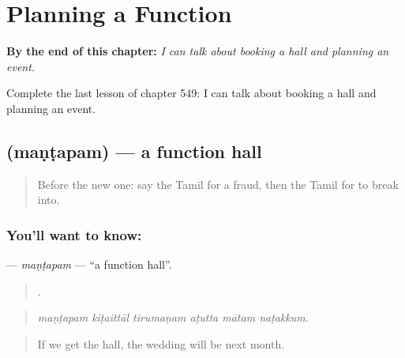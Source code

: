 
\chapter{Planning a Function}
\label{ch:ta-planning-a-function}

\begin{chapteropening}
\textbf{By the end of this chapter:} \emph{I can talk about booking a hall and planning an event.}

Complete the last lesson of chapter 549: I can talk about booking a hall and planning an event.
\end{chapteropening}

\section[\texorpdfstring{\ta{மண்டபம்} (maṇṭapam)}{மண்டபம் (maṇṭapam)}]{ (maṇṭapam) — a function hall}

\label{lesson:TA-C549-mantapam}



\begin{quote}
Before the new one: say the Tamil for a fraud, then the Tamil for to break into.
\end{quote}

\subsection*{You'll want to know: }
\textbf{} — \emph{maṇṭapam} — \textquotedblleft{}a function hall\textquotedblright{}.

\begin{quote}
     .
\end{quote}

\begin{quote}
\emph{maṇṭapam kiṭaittāl tirumaṇam aṭutta mātam naṭakkum.}
\end{quote}

\begin{quote}
If we get the hall, the wedding will be next month.
\end{quote}

